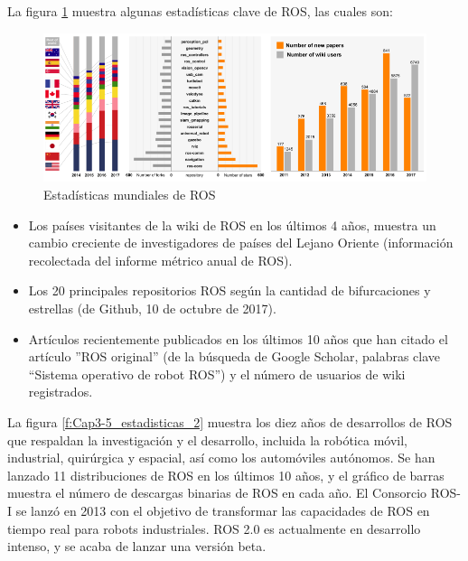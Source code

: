         La figura \ref{f:Cap3-5_estadisticas_1} muestra algunas estadísticas clave de ROS, las cuales son:

            \begin{figure}[htb]
                \centering
                \includegraphics[width=1.0\linewidth]{Main/Chapter3/Images3/science_robot_esta_1.png}
                \caption{Estadísticas mundiales de ROS \cite{Zhangeaar1868}}
                \label{f:Cap3-5_estadisticas_1}
            \end{figure}        

        \begin{itemize}
            \item {Los países visitantes de la wiki de ROS en los últimos 4 años, muestra un cambio creciente de investigadores de países del Lejano Oriente (información recolectada del informe métrico anual de ROS). }
            \item {Los 20 principales repositorios ROS según la cantidad de bifurcaciones y estrellas (de Github, 10 de octubre de 2017).}
            \item {Artículos recientemente publicados en los últimos 10 años que han citado el artículo ''ROS original'' (de la búsqueda de Google Scholar, palabras clave “Sistema operativo de robot ROS”) y el número de usuarios de wiki registrados.}
        \end{itemize}
        

        La figura \ref{f:Cap3-5_estadisticas_2} muestra los diez años de desarrollos de ROS que respaldan la investigación y el desarrollo, incluida la robótica móvil, industrial, quirúrgica y espacial, así como los automóviles autónomos. Se han lanzado 11 distribuciones de ROS en los últimos 10 años, y el gráfico de barras muestra el número de descargas binarias de ROS en cada año. El Consorcio ROS-I se lanzó en 2013 con el objetivo de transformar las capacidades de ROS en tiempo real para robots industriales. ROS 2.0 es actualmente en desarrollo intenso, y se acaba de lanzar una versión beta.

